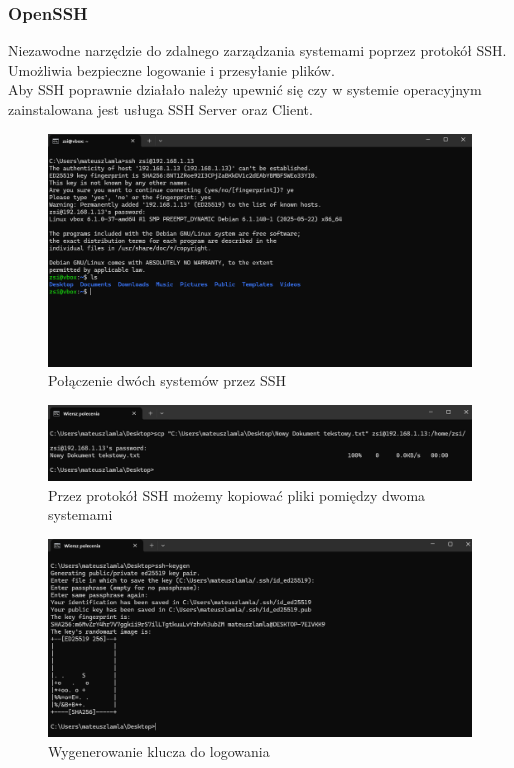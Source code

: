 \documentclass[0.82pt,a4paper]{article}
\begin{document}
\subsubsection{OpenSSH}
    Niezawodne narzędzie do zdalnego zarządzania systemami poprzez protokół SSH. Umożliwia bezpieczne logowanie i przesyłanie plików.
    \\
    Aby SSH poprawnie działało należy upewnić się czy w systemie operacyjnym zainstalowana jest usługa SSH Server oraz Client.
    \begin{figure}[H]
        \centering
        \includegraphics[width=0.8\linewidth]{media/OpenSSH/1_poloczenie.png}
        \caption[polaczenie ssh]{Połączenie dwóch systemów przez SSH}
        \label{fig:ssh_polaczenie}
    \end{figure}

    \begin{figure}[H]
        \centering
        \includegraphics[width=0.8\linewidth]{media/OpenSSH/2_kopiowanie_plikow.png}
        \caption[kopiowanie ssh]{Przez protokół SSH możemy kopiować pliki pomiędzy dwoma systemami}
        \label{fig:ssh_kopiowanie}
    \end{figure}

    \begin{figure}[H]
        \centering
        \includegraphics[width=0.8\linewidth]{media/OpenSSH/3_tworzenie_klucza.png}
        \caption[klucz ssh]{Wygenerowanie klucza do logowania}
        \label{fig:ssh_klucz}
    \end{figure}
\end{document}
